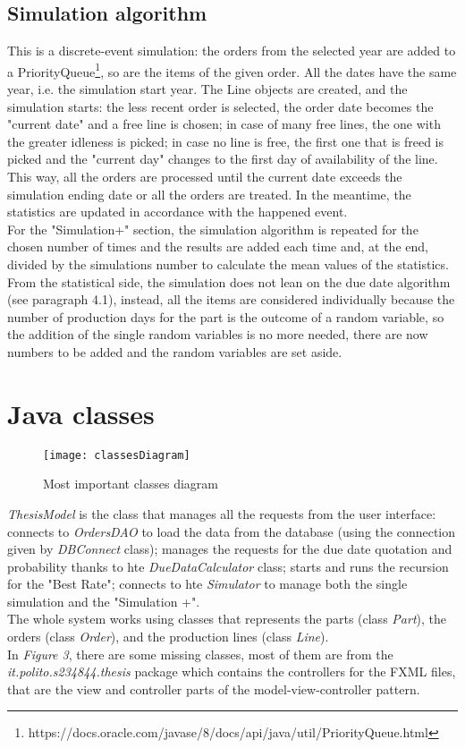 \documentclass[a4paper,12pt]{article}
\begin{document}
\subsection{Simulation algorithm}
 This is a discrete-event simulation: the orders from the selected year are added to a PriorityQueue\footnote{https://docs.oracle.com/javase/8/docs/api/java/util/PriorityQueue.html}, so are the items of the given order. All the dates have the same year, i.e. the simulation start year. The Line objects are created, and the simulation starts: the less recent order is selected, the order date becomes the "current date" and a free line is chosen; in case of many free lines, the one with the greater idleness is picked; in case no line is free, the first one that is freed is picked and the "current day" changes to the first day of availability of the line. This way, all the orders are processed until the current date exceeds the simulation ending date or all the orders are treated. In the meantime, the statistics are updated in accordance with the happened event. \\
For the "Simulation+" section, the simulation algorithm is repeated for the chosen number of times and the results are added each time and, at the end, divided by the simulations number to calculate the mean values of the statistics.\\
From the statistical side, the simulation does not lean on the due date algorithm (see paragraph 4.1), instead, all the items are considered individually because the number of production days for the part  is the outcome of a random variable, so the addition of the single random variables is no more needed, there are now numbers to be added and the random variables are set aside.

\newpage
\section{Java classes}
\begin{figure}[H]
	\centering
   	 \texttt{[image: classesDiagram]}
	\caption{Most important classes diagram}
\end{figure}
\textit{ThesisModel} is the class that manages all the requests from the user interface: connects to \textit{OrdersDAO} to load the data from the database (using the connection given by \textit{DBConnect} class); manages the requests for the due date quotation and probability thanks to hte \textit{DueDataCalculator} class; starts and runs the recursion for the "Best Rate"; connects to hte \textit{Simulator} to manage both the single simulation and the "Simulation +".\\
The whole system works using classes that represents the parts (class \textit{Part}), the orders (class \textit{Order}), and the production lines (class \textit{Line}).\\
In \textit{Figure 3}, there are some missing classes, most of them are from the \textit{it.polito.s234844.thesis} package which contains the controllers for the FXML files, that are the view and controller parts of the model-view-controller pattern. 
\end{document}
